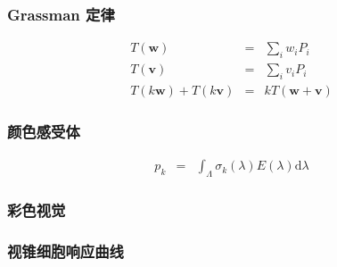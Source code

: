 \documentclass{beamer}
\newcommand{\mathd}{\mathrm{d}}
\newcommand{\nospace}{}
\newcommand{\tmmathbf}[1]{\ensuremath{\boldsymbol{#1}}}
\begin{document}
{{\begin{frame}
  \quad{}
\end{frame}}{\begin{frame}
  \frametitle{Grassman 定律}
  \begin{eqnarray*}
    T (\tmmathbf{w}) & = & \sum_i w_i P_i\\
    T (\tmmathbf{v}) & = & \sum_i v_i P_i\\
    T (k\tmmathbf{w}) + T (k\tmmathbf{v}) & = & k \nospace T
    (\tmmathbf{w}+\tmmathbf{v})
  \end{eqnarray*}
\end{frame}}{\begin{frame}
  \frametitle{颜色感受体}
  \begin{eqnarray*}
    p_k & = & \int_{\Lambda} \sigma_k (\lambda) E (\lambda) \mathd \lambda
  \end{eqnarray*}
  
\end{frame}}{\begin{frame}
  \frametitle{彩色视觉}
  
\end{frame}}{\begin{frame}
  \frametitle{视锥细胞响应曲线}
  

\end{frame}}}
\end{document}
